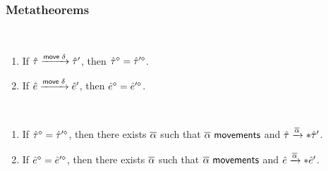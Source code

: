 \documentclass{article}
\begin{document}
%
\begin{mathpar}

\end{mathpar}

\judgbox{\ensuremath{\movements{\AIMV}}}
%
\begin{mathpar}

\end{mathpar}

\subsubsection{Metatheorems}
\begin{theorem}[name=Sensibility]
\end{theorem}

\begin{theorem}[name=Movement Erasure Invariance] \
  \begin{enumerate}
    \item If $\AUTAction{\ZTMV}{\ZTMV'}{\AMove{\MMV}}$, then $\cursorErase{\ZTMV} =
      \cursorErase{\ZTMV'}$.

    \item If $\AUEAction{\ZMV}{\ZMV'}{\AMove{\MMV}}$, then $\cursorErase{\ZMV} =
      \cursorErase{\ZMV'}$.
  \end{enumerate}
\end{theorem}

\begin{theorem}[name=Reachability] \
  \begin{enumerate}
    \item If $\cursorErase{\ZTMV} = \cursorErase{\ZTMV'}$, then there exists $\AIMV$ such that
      $\movements{\AIMV}$ and $\AUTActionIter{\ZTMV}{\ZTMV'}{\AIMV}$.

    \item If $\cursorErase{\ZMV} = \cursorErase{\ZMV'}$, then there exists $\AIMV$ such that
      $\movements{\AIMV}$ and $\AUEActionIter{\ZMV}{\ZMV'}{\AIMV}$.
  \end{enumerate}
\end{theorem}
\end{document}
